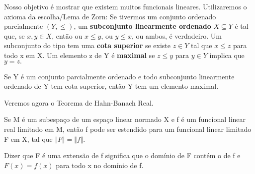 \documentclass[MeasureTheory/measure_theory.tex]{subfiles}
\begin{document}
Nosso objetivo é mostrar que existem muitos funcionais lineares. Utilizaremos o axioma da escolha/Lema de Zorn: Se tivermos um conjunto ordenado parcialmente \((Y, \leq )\), um \textbf{subconjunto linearmente ordenado} \(X\subseteq Y\) é tal que, se \(x, y\in X\), então ou \(x\leq y\), ou \(y \leq x\), ou ambos, é verdadeiro.
Um subconjunto do tipo tem uma \textbf{cota superior} se existe \(z\in Y\) tal que \(x\leq z\) para todo x em X.  Um elemento z de Y é \textbf{maximal} se \(z \leq y\) para \(y\in Y\) implica que \(y = z.\)
\hypertarget{zornn}{
	\begin{lemma*}
		Se Y é um conjunto parcialmente ordenado e todo subconjunto linearmente ordenado de Y tem cota superior, então Y tem um elemento maximal.
	\end{lemma*}
}
Veremos agora o Teorema de Hahn-Banach Real.
\hypertarget{real_hahn_banach}{
	\begin{theorem*}
		Se M é um subespaço de um espaço linear normado X e f é um funcional linear real limitado em M, então f pode ser estendido para um funcional linear limitado F em X, tal que \(\Vert F \Vert = \Vert f \Vert.\)
	\end{theorem*}
}
Dizer que F é uma extensão de f significa que o domínio de F contém o de f e \(F(x) = f(x)\) para todo x no domínio de f.
\end{document}
